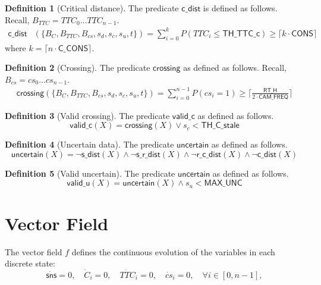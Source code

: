 \documentclass[12pt]{article}
\theoremstyle{definition}
\newtheorem{definition}{Definition}[section]
\begin{document}
\begin{definition}[Critical distance]
The predicate $\mathsf{c\_dist}$ is defined as follows. Recall, $B_{TTC} = TTC_0 \ldots TTC_{n-1}$.
\[
    \begin{aligned}
        \mathsf{c\_dist}&(\{B_C, B_{TTC}, B_{cs}, s_d, s_c, s_u, t\}) = \sum_{i=0}^{k} P(TTC_i \leq \mathsf{TH\_TTC\_c}) \geq \lceil k \cdot \mathsf{CONS}\rceil
    \end{aligned}
\]
where $k = \lceil n \cdot \mathsf{C\_CONS} \rceil$.    
\end{definition}

\begin{definition}[Crossing]
    The predicate $\mathsf{crossing}$ as defined as follows. Recall, $B_{cs} = cs_0 \ldots cs_{n-1}$.
    \[
        \begin{aligned}
            \mathsf{crossing}(\{B_C, B_{TTC}, B_{cs}, s_d, s_c, s_u, t\}) = \sum_{i=0}^{n-1} P(cs_i = 1) \geq \lceil \frac{\mathsf{RT\_H}}{ 2 \cdot \mathsf{CAM\_FREQ}} \rceil
        \end{aligned}
    \]
\end{definition}

\begin{definition}[Valid crossing]
    The predicate $\mathsf{valid\_c}$ as defined as follows.
    \[
        \mathsf{valid\_c}(X) = \mathsf{crossing}(X) \lor s_c < \mathsf{TH\_C\_stale}
    \]
\end{definition}

\begin{definition}[Uncertain data]
    The predicate $\mathsf{uncertain}$ as defined as follows.
    \[
        \mathsf{uncertain}(X) = \neg \mathsf{s\_dist}(X) \land \neg \mathsf{s\_r\_dist}(X) \land \neg \mathsf{r\_c\_dist}(X) \land \neg \mathsf{c\_dist}(X)
    \]
\end{definition}

\begin{definition}[Valid uncertain]
    The predicate $\mathsf{uncertain}$ as defined as follows.
    \[
        \mathsf{valid\_u}(X) = \mathsf{uncertain}(X) \land s_u < \mathsf{MAX\_UNC}
    \]
\end{definition}


\section{Vector Field}
The vector field $f$ defines the continuous evolution of the variables in each discrete state: 
\[
\dot{\mathsf{sns}} = 0, \quad \dot{C}_i = 0, \quad \dot{TTC}_i = 0, \quad \dot{cs}_i = 0, \quad \forall i \in [0,n-1], 
\]
\end{document}
